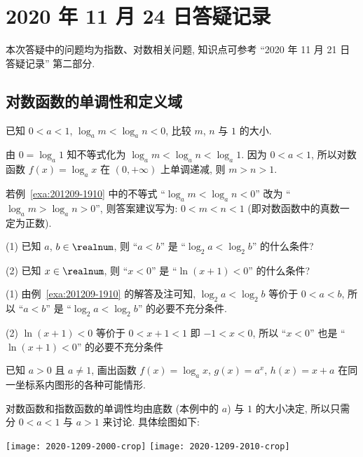 \section{2020 年 11 月 24 日答疑记录}

本次答疑中的问题均为指数、对数相关问题, 知识点可参考 ``2020 年 11 月 21 日答疑记录'' 第二部分.

\subsection{对数函数的单调性和定义域}

\begin{example}\label{exa:201209-1910}
    已知 $0<a<1$, $\log_a m< \log_a n< 0$, 比较 $m$, $n$ 与 $1$ 的大小.
\end{example}
\begin{solution}
    由 $0=\log_a 1$ 知不等式化为 $\log_a m< \log_a n< \log_a 1$. 因为 $0<a<1$, 所以对数函数 $f(x)= \log_a x$ 在 $(0,+\infty)$ 上单调递减, 则 $m>n>1$.
\end{solution}
\begin{remark}
    若例~\ref{exa:201209-1910} 中的不等式 ``$\log_a m< \log_a n< 0$'' 改为 ``$\log_a m> \log_a n> 0$'', 则答案建议写为: $0<m<n<1$ (即对数函数中的真数一定为正数).
\end{remark}

\begin{example}
    (1) 已知 $a$, $b\in\realnum$, 则 ``$a<b$'' 是 ``$\log_2 a<\log_2 b$'' 的什么条件?
    
    (2) 已知 $x\in\realnum$, 则 ``$x<0$'' 是 ``$\ln(x+1)<0$'' 的什么条件?
\end{example}
\begin{solution}
    (1) 由例~\ref{exa:201209-1910} 的解答及注可知, $\log_2 a<\log_2 b$ 等价于 $0<a<b$, 所以 ``$a<b$'' 是 ``$\log_2 a<\log_2 b$'' 的必要不充分条件.
    
    (2) $\ln(x+1)<0$ 等价于 $0<x+1<1$ 即 $-1<x<0$, 所以 ``$x<0$'' 也是 ``$\ln(x+1)<0$'' 的必要不充分条件
\end{solution}

\begin{example}
    已知 $a>0$ 且 $a\neq 1$, 画出函数 $f(x)= \log_a x$, $g(x)=a^x$, $h(x)= x+a$ 在同一坐标系内图形的各种可能情形.
\end{example}
\begin{solution}
    对数函数和指数函数的单调性均由底数 (本例中的 $a$) 与 $1$ 的大小决定, 所以只需分 $0<a<1$ 与 $a>1$ 来讨论. 具体绘图如下:
    
    \begin{center}
        \texttt{[image: 2020-1209-2000-crop]}\qquad
        \texttt{[image: 2020-1209-2010-crop]}
    \end{center}
\end{solution}

